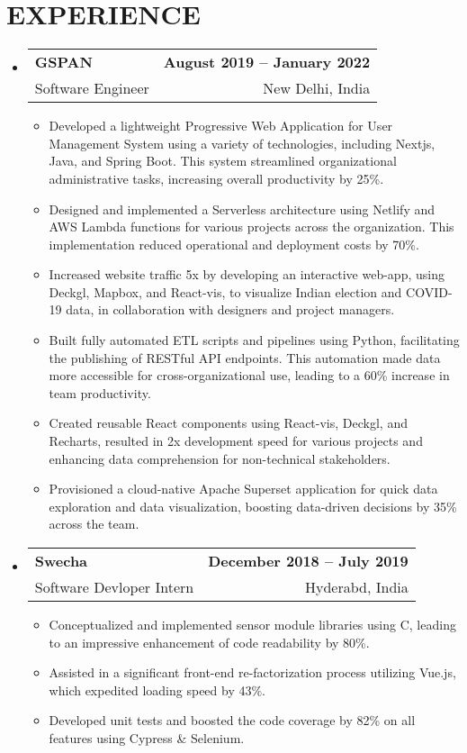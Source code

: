 \documentclass[letterpaper,10pt]{article}
\makeatletter
\newcommand{\resumeItem}[1]{
  \item\small{
    {#1 \vspace{-2pt}}
  }
}
\newcommand{\resumeSubheading}[4]{
  \vspace{-2pt}\item
    \begin{tabular*}{1.0\textwidth}[t]{l@{\extracolsep{\fill}}r}
      \textbf{#1} & \textbf{\small #2} \\
      {\small#3} & {\small #4} \\
    \end{tabular*}\vspace{-7pt}
}
\newcommand{\resumeSubHeadingListStart}{\begin{itemize}[leftmargin=0.0in, label={}]}
\newcommand{\resumeSubHeadingListEnd}{\end{itemize}}
\newcommand{\resumeItemListStart}{\begin{itemize}}
\newcommand{\resumeItemListEnd}{\end{itemize}\vspace{-5pt}}
\makeatother
\begin{document}
\section{EXPERIENCE}
  \resumeSubHeadingListStart
    \resumeSubheading
      {GSPAN}{August 2019 -- January 2022}
      {Software Engineer}{New Delhi, India}
      \resumeItemListStart
        \resumeItem{Developed a lightweight Progressive Web Application for User Management System using a variety of technologies, including Nextjs, Java, and Spring Boot. This system streamlined organizational administrative tasks, increasing overall productivity by 25\%.}
        \resumeItem{Designed and implemented a Serverless architecture using Netlify and AWS Lambda functions for various projects across the organization. This implementation reduced operational and deployment costs by 70\%.}
        \resumeItem{Increased website traffic 5x by developing an interactive web-app, using Deckgl, Mapbox, and React-vis, to visualize Indian election and COVID-19 data, in collaboration with designers and project managers.}
        \resumeItem{Built fully automated ETL scripts and pipelines using Python, facilitating the publishing of RESTful API endpoints. This automation made data more accessible for cross-organizational use, leading to a 60\% increase in team productivity.}
        \resumeItem{Created reusable React components using React-vis, Deckgl, and Recharts, resulted in 2x development speed for various projects and enhancing data comprehension for non-technical stakeholders.}
        \resumeItem{Provisioned a cloud-native Apache Superset application for quick data exploration and data visualization, boosting data-driven decisions by 35\% across the team.}
      \resumeItemListEnd

    \resumeSubheading
      {Swecha}{December 2018 -- July 2019}
      {Software Devloper Intern}{Hyderabd, India}
      \resumeItemListStart
        \resumeItem{Conceptualized and implemented sensor module libraries using C, leading to an impressive enhancement of code readability by 80\%.}
        \resumeItem{Assisted in a significant front-end re-factorization process utilizing Vue.js, which expedited loading speed by 43\%.}
        \resumeItem{Developed unit tests and boosted the code coverage by 82\% on all features using Cypress \& Selenium.}
      \resumeItemListEnd
  \resumeSubHeadingListEnd

\end{document}
